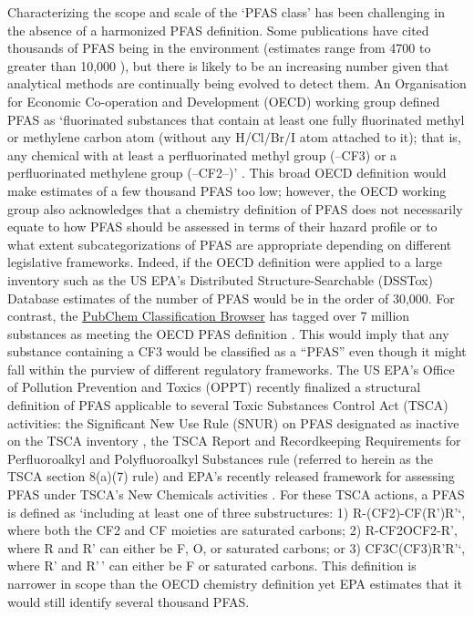 \documentclass[
  super,
  preprint,
  3p]{elsarticle}
\begin{document}
Characterizing the scope and scale of the `PFAS class' has been
challenging in the absence of a harmonized PFAS definition. Some
publications have cited thousands of PFAS being in the environment
(estimates range from 4700 \citep{oecd_reconciling_2021} to greater than
10,000 \citep{gaber_devil_nodate}), but there is likely to be an
increasing number given that analytical methods are continually being
evolved to detect them. An Organisation for Economic Co-operation and
Development (OECD) working group defined PFAS as `fluorinated substances
that contain at least one fully fluorinated methyl or methylene carbon
atom (without any H/Cl/Br/I atom attached to it); that is, any chemical
with at least a perfluorinated methyl group (--CF3) or a perfluorinated
methylene group (--CF2--)' \citep{oecd_reconciling_2021, wang_new_2021}.
This broad OECD definition would make estimates of a few thousand PFAS
too low; however, the OECD working group also acknowledges that a
chemistry definition of PFAS does not necessarily equate to how PFAS
should be assessed in terms of their hazard profile or to what extent
subcategorizations of PFAS are appropriate depending on different
legislative frameworks. Indeed, if the OECD definition were applied to a
large inventory such as the US EPA's Distributed Structure-Searchable
(DSSTox) Database \citep{grulke_epas_2019} estimates of the number of
PFAS would be in the order of 30,000. For contrast, the
\href{https://pubchem.ncbi.nlm.nih.gov/classification/\#hid=120}{PubChem
Classification Browser} has tagged over 7 million substances as meeting
the OECD PFAS definition \citep{schymanski_per-_2023}. This would imply
that any substance containing a CF3 would be classified as a ``PFAS''
even though it might fall within the purview of different regulatory
frameworks. The US EPA's Office of Pollution Prevention and Toxics
(OPPT) recently finalized a structural definition of PFAS applicable to
several Toxic Substances Control Act (TSCA) activities: the Significant
New Use Rule (SNUR) on PFAS designated as inactive on the TSCA inventory
\citep{epa_2023}, the TSCA Report and Recordkeeping Requirements for
Perfluoroalkyl and Polyfluoroalkyl Substances rule (referred to herein
as the TSCA section 8(a)(7) rule) \citep{epa_2023b} and EPA's recently
released framework for assessing PFAS under TSCA's New Chemicals
activities \citep{epa_2023c}. For these TSCA actions, a PFAS is defined
as `including at least one of three substructures: 1) R-(CF2)-CF(R')R'`,
where both the CF2 and CF moieties are saturated carbons; 2)
R-CF2OCF2-R', where R and R' can either be F, O, or saturated carbons;
or 3) CF3C(CF3)R'R'`, where R' and R'\,' can either be F or saturated
carbons. This definition is narrower in scope than the OECD chemistry
definition yet EPA estimates that it would still identify several
thousand PFAS.
\end{document}
